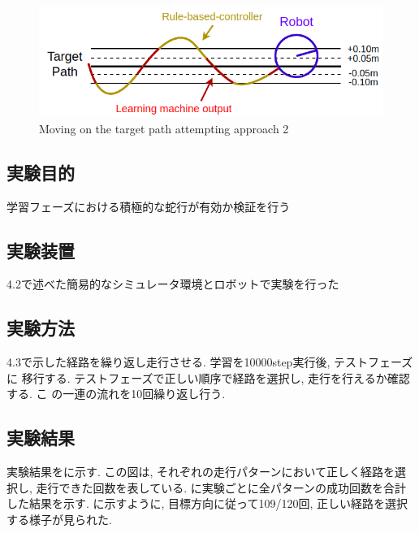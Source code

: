 \begin{figure}[hbtp]
  \centering
 \includegraphics[keepaspectratio, scale=0.58]
      {images/act1.5.png}
 \caption{Moving on the target path attempting approach 2}
 \label{Fig:act1.5}
\end{figure}


  \subsection{実験目的}
  学習フェーズにおける積極的な蛇行が有効か検証を行う
  \subsection{実験装置}
  4.2で述べた簡易的なシミュレータ環境とロボットで実験を行った
  \subsection{実験方法}
  4.3で示した経路を繰り返し走行させる. 学習を10000step実行後, テストフェーズに
  移行する. テストフェーズで正しい順序で経路を選択し, 走行を行えるか確認する. こ
  の一連の流れを10回繰り返し行う.
  \subsection{実験結果}
  実験結果をに示す. この図は, それぞれの走行パターンにおいて正しく経路を選択し, 走行できた回数を表している. に実験ごとに全パターンの成功回数を合計した結果を示す. 
  に示すように, 目標方向に従って109/120回, 正しい経路を選択する様子が見られた. 

